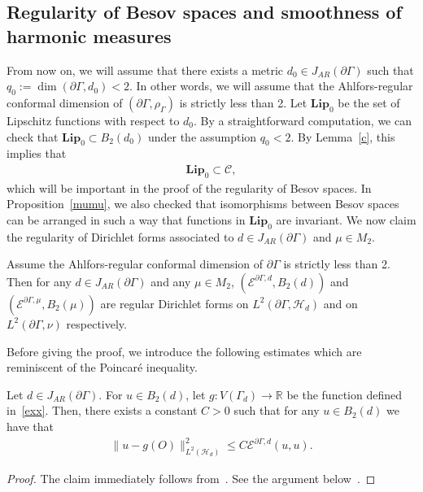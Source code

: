 \documentclass[AHL,Unicode,longabstracts,published]{cedram}
\newcommand{\ce}{\mathcal{E}}
\newcommand{\ch}{\mathcal{H}}
\newcommand{\cC}{\mathcal{C}}
\newcommand{\br}{\mathbb{R}}
\newcommand{\bfLip}{\mathbf{Lip}}
\begin{document}
\subsection{Regularity of Besov spaces and smoothness of harmonic measures}\label{subsec:regu}
From now on, we will assume that there exists a metric $d_0\in J_{AR}(\partial\Gamma)$ such that $q_0:=\dim(\partial\Gamma,d_0)<2$. In other words, we will assume that the Ahlfors-regular conformal dimension of $(\partial\Gamma,\rho_{\Gamma})$ is strictly less than 2. Let $\bfLip_0$ be the set of Lipschitz functions with respect to $d_0$. By a straightforward computation, we can check that $\bfLip_0\subset B_2(d_0)$ under the assumption $q_0<2$. By Lemma~\ref{c}, this implies that
\begin{align}\label{0=c}
\bfLip_0\subset\cC,
\end{align}
which will be important in the proof of the regularity of Besov spaces. In Proposition~\ref{mumu}, we also checked that isomorphisms between Besov spaces can be arranged in such a way that functions in $\bfLip_0$ are invariant. We now claim the regularity of Dirichlet forms associated to $d\in J_{AR}(\partial\Gamma)$ and $\mu\in M_2$.

\begin{theo}\label{reg}
Assume the Ahlfors-regular conformal dimension of $\partial\Gamma$ is strictly less than 2. Then for any $d\in J_{AR}(\partial\Gamma)$ and any $\mu\in M_2$, $(\ce^{\partial\Gamma,d},B_2(d))$ and $(\ce^{\partial\Gamma,\mu},B_2(\mu))$ are regular Dirichlet forms on $L^2(\partial\Gamma,\ch_{d})$ and on $L^2(\partial\Gamma,\nu)$ respectively.
\end{theo}

Before giving the proof, we introduce the following estimates which are reminiscent of the Poincaré inequality.
\begin{lemm}\label{bpoin}
Let $d\in J_{AR}(\partial\Gamma)$. For $u\in B_2(d)$, let $g:V(\Gamma_{d})\rightarrow\br$ be the function defined in~\eqref{exx}. Then, there exists a constant $C>0$ such that for any $u\in B_2(d)$ we have that
\begin{align*}
\|u-g(O)\|^2_{L^2(\ch_{d})}\leq C\ce^{\partial\Gamma,d}(u,u).
\end{align*}
\end{lemm}

\begin{proof}
The claim immediately follows from~\cite[Theorem~3.1 and Lemma~3.2]{BP}. See the argument below~\cite[Lemma~3.2]{BP}.
\end{proof}
\end{document}
